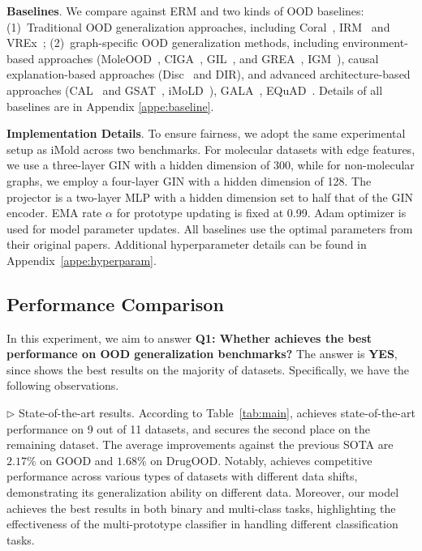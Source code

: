 \noindent\textbf{Baselines}.  We compare \ourmethod against ERM and two kinds of OOD baselines: (1)~Traditional OOD generalization approaches, including  Coral~\citep{coral}, IRM~\citep{arjovsky2019invariant} and VREx~\citep{krueger2021out}; (2)~graph-specific OOD generalization methods, including environment-based approaches (MoleOOD~\citep{yang2022learning}, CIGA~\citep{chen2022learning}, GIL~\citep{li2022learning}, and GREA~\citep{liu2022graph}, IGM~\citep{jia2024graph}), causal explanation-based approaches (Disc~\citep{fan2022debiasing} and DIR\citep{wu2022discovering}), and advanced architecture-based approaches (CAL~\citep{sui2022causal} and GSAT~\citep{miao2022interpretable}, iMoLD~\citep{zhuang2023learning}), GALA~\citep{Equad}, EQuAD~\citep{gala}. Details of all baselines are in Appendix \ref{appe:baseline}.

\noindent\textbf{Implementation Details}. To ensure fairness, we adopt the same experimental setup as iMold across two benchmarks. For molecular datasets with edge features, we use a three-layer GIN with a hidden dimension of 300, while for non-molecular graphs, we employ a four-layer GIN with a hidden dimension of 128. The projector is a two-layer MLP with a hidden dimension set to half that of the GIN encoder. EMA rate $\alpha$ for prototype updating is fixed at 0.99. Adam optimizer is used for model parameter updates.  All baselines use the optimal parameters from their original papers. Additional hyperparameter details can be found in Appendix~\ref{appe:hyperparam}.

\subsection{Performance Comparison}\label{subsec:results}

In this experiment, we aim to answer
\textbf{Q1: Whether \ourmethod achieves the best performance on OOD generalization benchmarks?} 
The answer is \textbf{YES}, since \ourmethod shows the best results on the majority of datasets. Specifically, we have the following observations.

 \noindent$\rhd$ \textsf{State-of-the-art results.}
According to Table~\ref{tab:main}, \ourmethod achieves state-of-the-art performance on 9 out of 11 datasets, and secures the second place on the remaining dataset. The average improvements against the previous SOTA are $2.17\%$ on GOOD and $1.68\%$ on DrugOOD. Notably, \ourmethod achieves competitive performance across various types of datasets with different data shifts, demonstrating its generalization ability on different data. Moreover, our model achieves the best results in both binary and multi-class tasks, highlighting the effectiveness of the multi-prototype classifier in handling different classification tasks.

